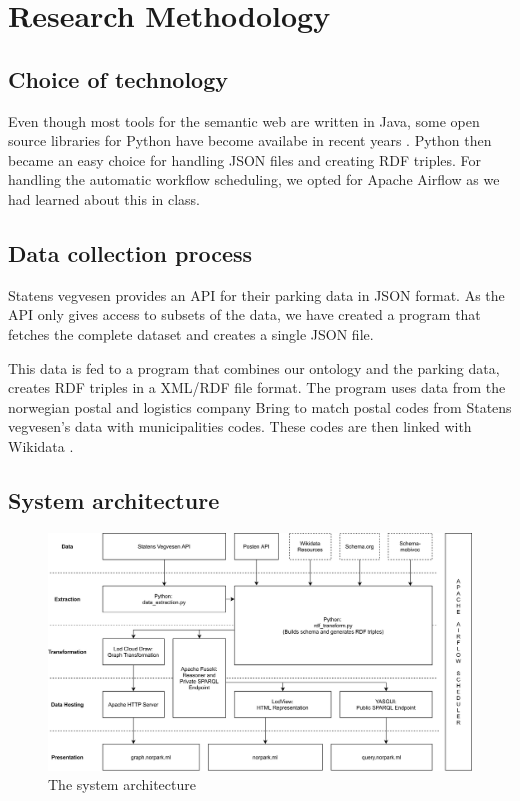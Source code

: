 \chapter{Research Methodology}

\section{Choice of technology}
Even though most tools for the semantic web are written in Java, some open source libraries for Python have become availabe in recent years \cite{w3java}. Python then became an easy choice for handling JSON files and creating RDF triples. For handling the automatic workflow scheduling, we opted for Apache Airflow as we had learned about this in class.


\section{Data collection process}
Statens vegvesen \cite{statensvegvesen} provides an API for their parking data in JSON format. As the API only gives access to subsets of the data, we have created a program that fetches the complete dataset and creates a single JSON file.

This data is fed to a program that combines our ontology and the parking data, creates RDF triples in a XML/RDF file format. The program uses data from the norwegian postal and logistics company Bring \cite{bring} to match postal codes from Statens vegvesen's data with municipalities codes. These codes are then linked with Wikidata \cite{wikidata}.


\section{System architecture}

\begin{figure}[H]
	\centering
	\includegraphics[width=\linewidth]{figures/system-architecture.png}
	\caption{The system architecture}
\end{figure}



